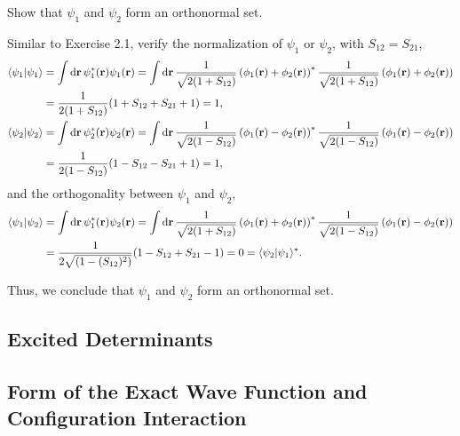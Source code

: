 \documentclass[a4paper]{book}
\newcounter{exercise}[chapter]
\newcounter{solution}[chapter]
\newcommand*{\dif}{\mathop{}\!\mathrm{d}}
\newcommand{\bfr}{{\bf r}}
\begin{document}
	\begin{exercise}
	Show that $\psi_1$ and $\psi_2$ form an orthonormal set.
	\end{exercise}
	
	\begin{solution}
	Similar to Exercise 2.1, verify the normalization of $\psi_1$ or $\psi_2$, with $S_{12} = S_{21}$,
	\begin{align*}
		\langle \psi_1 | \psi_1 \rangle &= \int \dif \bfr \, \psi^*_1( \bfr ) \psi_1( \bfr ) = \int \dif \bfr \,  \frac{1}{ \sqrt{ 2 ( 1 + S_{12} ) } } \left( \phi_1(\bfr) + \phi_2(\bfr) \right)^* \frac{1}{ \sqrt{ 2 ( 1 + S_{12} ) } } \left( \phi_1(\bfr) + \phi_2(\bfr) \right) \notag \\
		&= \frac{1}{ 2 ( 1 + S_{12} ) } ( 1 + S_{12} + S_{21} + 1 ) = 1, \\
		\langle \psi_2 | \psi_2 \rangle &= \int \dif \bfr \, \psi^*_2( \bfr ) \psi_2( \bfr ) = \int \dif \bfr \,  \frac{1}{ \sqrt{ 2 ( 1 - S_{12} ) } } \left( \phi_1(\bfr) - \phi_2(\bfr) \right)^* \frac{1}{ \sqrt{ 2 ( 1 - S_{12} ) } } \left( \phi_1(\bfr) - \phi_2(\bfr) \right) \notag \\
		&= \frac{1}{ 2 ( 1 - S_{12} ) } ( 1 - S_{12} - S_{21} + 1 ) = 1,
	\end{align*}
	and the orthogonality between $\psi_1$ and $\psi_2$,
	\begin{align*}
		\langle \psi_1 | \psi_2 \rangle &= \int \dif \bfr \, \psi^*_1( \bfr ) \psi_2( \bfr ) = \int \dif \bfr \,  \frac{1}{ \sqrt{ 2 ( 1 + S_{12} ) } } \left( \phi_1(\bfr) + \phi_2(\bfr) \right)^* \frac{1}{ \sqrt{ 2 ( 1 - S_{12} ) } } \left( \phi_1(\bfr) - \phi_2(\bfr) \right) \notag \\
		&= \frac{1}{ 2 \sqrt{  ( 1 - (S_{12})^2 ) } } ( 1 - S_{12} + S_{21} - 1 ) = 0 = \langle \psi_2 | \psi_1 \rangle^*.
	\end{align*}	
	
	Thus, we conclude that $\psi_1$ and $\psi_2$ form an orthonormal set.
	\end{solution}
	
	\subsection{Excited Determinants}
	
	\subsection{Form of the Exact Wave Function and Configuration Interaction}
	
\end{document}
